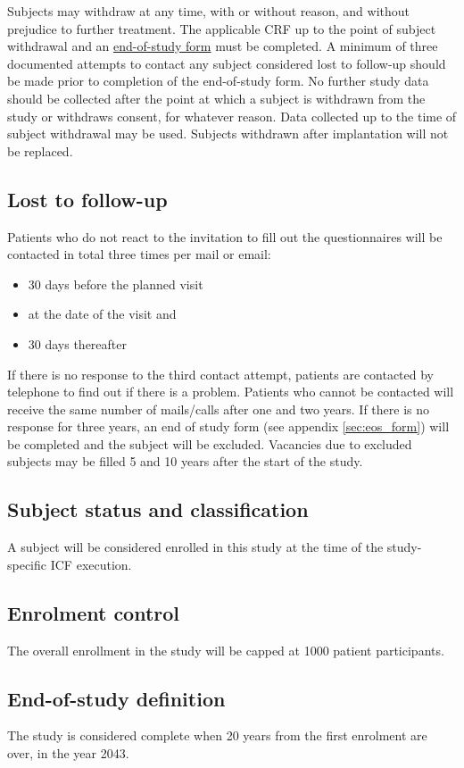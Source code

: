 Subjects may withdraw at any time, with or without reason, and without prejudice to further treatment. The applicable \ac{CRF} up to the point of subject withdrawal and an \hyperref[sec:eos_form]{end-of-study form} must be completed. A minimum of three documented attempts to contact any subject considered lost to follow-up should be made prior to completion of the end-of-study form. No further study data should be collected after the point at which a subject is withdrawn from the study or withdraws consent, for whatever reason. Data collected up to the time of subject withdrawal may be used. Subjects withdrawn after implantation will not be replaced.

\subsection{Lost to follow-up}
Patients who do not react to the invitation to fill out the questionnaires will be contacted in total three times per mail or email:
\begin{itemize}
\item 30 days before the planned visit
\item at the date of the visit and
\item 30 days thereafter
\end{itemize}
If there is no response to the third contact attempt, patients are contacted by telephone to find out if there is a problem. Patients who cannot be contacted will receive the same number of mails/calls after one and two years. If there is no response for three years, an end of study form (see appendix \ref{sec:eos_form}) will be completed and the subject will be excluded. Vacancies due to excluded subjects may be filled 5 and 10 years after the start of the study.

\subsection{Subject status and classification}
A subject will be considered enrolled in this study at the time of the study-specific \ac{ICF} execution.

\subsection{Enrolment control}
The overall enrollment in the study will be capped at \num[round-precision = 0, round-mode = places]{1000} patient participants.

\subsection{End-of-study definition}
The study is considered complete when 20 years from the first enrolment are over, in the year 2043.

